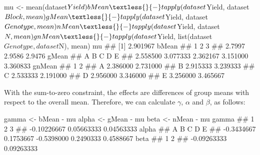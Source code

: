 \documentclass[a4paper,12pt,oneside]{book}
\newenvironment{Shaded}{\begin{snugshade}}{\end{snugshade}}
\newcommand{\SpecialCharTok}[1]{#1}
\newcommand{\DocumentationTok}[1]{#1}
\newcommand{\OtherTok}[1]{#1}
\newcommand{\FunctionTok}[1]{#1}
\newcommand{\NormalTok}[1]{#1}
\begin{document}
\begin{Shaded}
\begin{Highlighting}[]
\NormalTok{mu }\OtherTok{\textless{}{-}} \FunctionTok{mean}\NormalTok{(dataset}\SpecialCharTok{$}\NormalTok{Yield)}
\NormalTok{bMean }\OtherTok{\textless{}{-}} \FunctionTok{tapply}\NormalTok{(dataset}\SpecialCharTok{$}\NormalTok{Yield, dataset}\SpecialCharTok{$}\NormalTok{Block, mean)}
\NormalTok{gMean }\OtherTok{\textless{}{-}} \FunctionTok{tapply}\NormalTok{(dataset}\SpecialCharTok{$}\NormalTok{Yield, dataset}\SpecialCharTok{$}\NormalTok{Genotype, mean)}
\NormalTok{nMean }\OtherTok{\textless{}{-}} \FunctionTok{tapply}\NormalTok{(dataset}\SpecialCharTok{$}\NormalTok{Yield, dataset}\SpecialCharTok{$}\NormalTok{N, mean)}
\NormalTok{gnMean }\OtherTok{\textless{}{-}} \FunctionTok{tapply}\NormalTok{(dataset}\SpecialCharTok{$}\NormalTok{Yield, }\FunctionTok{list}\NormalTok{(dataset}\SpecialCharTok{$}\NormalTok{Genotype,dataset}\SpecialCharTok{$}\NormalTok{N), mean)}
\NormalTok{mu}
\DocumentationTok{\#\# [1] 2.901967}
\NormalTok{bMean}
\DocumentationTok{\#\#      1      2      3 }
\DocumentationTok{\#\# 2.7997 2.9586 2.9476}
\NormalTok{gMean}
\DocumentationTok{\#\#        A        B        C        D        E }
\DocumentationTok{\#\# 2.558500 3.077333 2.362167 3.151000 3.360833}
\NormalTok{gnMean}
\DocumentationTok{\#\#          1        2}
\DocumentationTok{\#\# A 2.386000 2.731000}
\DocumentationTok{\#\# B 2.915333 3.239333}
\DocumentationTok{\#\# C 2.533333 2.191000}
\DocumentationTok{\#\# D 2.956000 3.346000}
\DocumentationTok{\#\# E 3.256000 3.465667}
\end{Highlighting}
\end{Shaded}

With the sum-to-zero constraint, the effects are differences of group means with respect to the overall mean. Therefore, we can calculate \(\gamma\), \(\alpha\) and \(\beta\), as follows:

\vspace{12pt}

\begin{Shaded}
\begin{Highlighting}[]
\NormalTok{gamma }\OtherTok{\textless{}{-}}\NormalTok{ bMean }\SpecialCharTok{{-}}\NormalTok{ mu}
\NormalTok{alpha }\OtherTok{\textless{}{-}}\NormalTok{ gMean }\SpecialCharTok{{-}}\NormalTok{ mu}
\NormalTok{beta }\OtherTok{\textless{}{-}}\NormalTok{ nMean }\SpecialCharTok{{-}}\NormalTok{ mu}
\NormalTok{gamma}
\DocumentationTok{\#\#           1           2           3 }
\DocumentationTok{\#\# {-}0.10226667  0.05663333  0.04563333}
\NormalTok{alpha}
\DocumentationTok{\#\#          A          B          C          D          E }
\DocumentationTok{\#\# {-}0.3434667  0.1753667 {-}0.5398000  0.2490333  0.4588667}
\NormalTok{beta}
\DocumentationTok{\#\#           1           2 }
\DocumentationTok{\#\# {-}0.09263333  0.09263333}
\end{Highlighting}
\end{Shaded}
\end{document}
